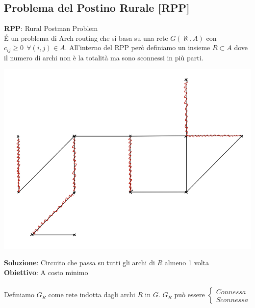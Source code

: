 \documentclass[12pt,a4paper]{article}
\begin{document}
\subsection{Problema del Postino Rurale [RPP]}
\textbf{RPP}: Rural Postman Problem\\
\'E un problema di Arch routing che si basa su una rete $G(\aleph, A)$ con $c_{ij} \geq 0 \ \ \forall (i,j) \in A$. All'interno del RPP però definiamo un insieme $R \subset A$ dove il numero di archi non è la totalità ma sono sconnessi in più parti.\\
\begin{center}
\includegraphics[width=0.6\columnwidth]{img/rpp.jpeg}\\
\end{center}
\textbf{Soluzione}: Circuito che passa su tutti gli archi di $R$ almeno 1 volta\\
\textbf{Obiettivo}: A costo minimo\\
\\
Definiamo $G_R$ come rete indotta dagli archi $R$ in $G$. $G_R$ può essere $\begin{cases}Connessa\\Sconnessa\end{cases}$
\end{document}
